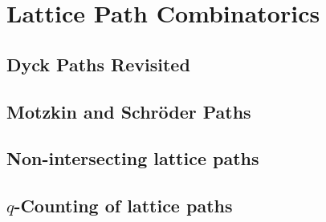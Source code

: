 \chapter{Lattice Path Combinatorics}



\section{Dyck Paths Revisited}

\section{Motzkin and Schr\"oder Paths}


\section{Non-intersecting lattice paths}


\section{$q$-Counting of lattice paths}


\endinput
